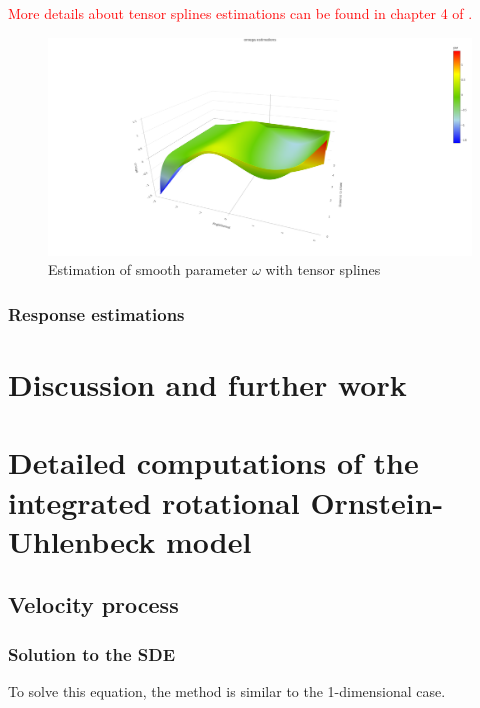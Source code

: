 \documentclass[11pt]{article}
\newcommand {\1}{\mathbb{1}}
\begin{document}
\textcolor{red}{More details about tensor splines estimations can be found in chapter 4 of \cite{wood_generalized_2017}.}

\begin{figure}[H]
	\centering
	\includegraphics[width=0.7\linewidth]{images/constrained_models/omega_estimations}
	\caption{Estimation of smooth parameter $\omega$ with tensor splines}
	\label{fig:omegaestimations}
\end{figure}



\subsubsection{Response estimations}



\section{Discussion and further work}

\newpage

\printbibliography

\newpage 

\appendix

\section{Detailed computations of the integrated rotational Ornstein-Uhlenbeck model}
\label{section: detailed RACVM computations}

\subsection{Velocity process}

\subsubsection{Solution to the SDE}

To solve this equation, the method is similar to the 1-dimensional case.
\end{document}
